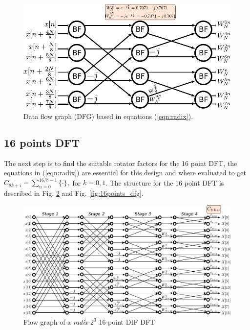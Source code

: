 \documentclass[journal,comsoc]{IEEEtran}
\begin{document}
\begin{figure}[ht]
	\centering
	\includegraphics[width=\linewidth]{Diagramas/miSeccionFiguras/8PuntosRadix8Burbujas.pdf}
	\caption{Data flow graph (DFG) based in equations (\ref{eqn:radix}).}
	\label{fig:8ponits_dfg}
\end{figure}

\subsection{16 points DFT}
The next step is to find the suitable rotator factors for the 16 point DFT, the equations in (\ref{eqn:radix}) are essential for this design and where evaluated to get $C_{8k+i} = \sum_{n=0}^{16/8-1} \{ \cdot \}, $ for $k=0,1$. The structure for the 16 point DFT is described in Fig. \ref{fig:16points_df} and Fig. \ref{fig:16points_dfg}. 

\begin{figure}[ht]
	\centering
	\includegraphics[width=\linewidth]{Diagramas/miSeccionFiguras/16PuntosRadix8Conexion.pdf}
	\caption{Flow graph of a \textit{radix-}$2^3$ 16-point DIF DFT}
	\label{fig:16points_df}
\end{figure}
\end{document}
